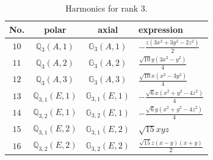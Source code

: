\documentclass[fleqn,8pt,landscape]{jsarticle}
\begin{document}
\begin{table}[ht!]
\begin{center}
\caption{Harmonics for rank 3.}
\renewcommand{\arraystretch}{1.3}
\begin{tabular}{cccl} \hline \hline
No. & polar & axial & expression \\ \hline
$ 10 $ & $ \mathbb{Q}_{3}(A,1) $ & $ \mathbb{G}_{3}(A,1) $ & $ - \frac{z \left(3 x^{2} + 3 y^{2} - 2 z^{2}\right)}{2} $ \\
$ 11 $ & $ \mathbb{Q}_{3}(A,2) $ & $ \mathbb{G}_{3}(A,2) $ & $ \frac{\sqrt{10} y \left(3 x^{2} - y^{2}\right)}{4} $ \\
$ 12 $ & $ \mathbb{Q}_{3}(A,3) $ & $ \mathbb{G}_{3}(A,3) $ & $ \frac{\sqrt{10} x \left(x^{2} - 3 y^{2}\right)}{4} $ \\
$ 13 $ & $ \mathbb{Q}_{3,1}(E,1) $ & $ \mathbb{G}_{3,1}(E,1) $ & $ - \frac{\sqrt{6} x \left(x^{2} + y^{2} - 4 z^{2}\right)}{4} $ \\
$ 14 $ & $ \mathbb{Q}_{3,2}(E,1) $ & $ \mathbb{G}_{3,2}(E,1) $ & $ - \frac{\sqrt{6} y \left(x^{2} + y^{2} - 4 z^{2}\right)}{4} $ \\
$ 15 $ & $ \mathbb{Q}_{3,1}(E,2) $ & $ \mathbb{G}_{3,1}(E,2) $ & $ \sqrt{15} x y z $ \\
$ 16 $ & $ \mathbb{Q}_{3,2}(E,2) $ & $ \mathbb{G}_{3,2}(E,2) $ & $ \frac{\sqrt{15} z \left(x - y\right) \left(x + y\right)}{2} $ \\
 \hline \hline
\end{tabular}
\end{center}
\end{table}
\end{document}
